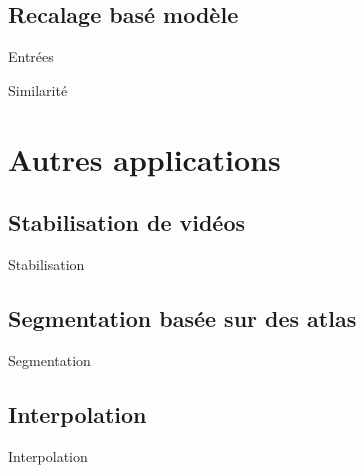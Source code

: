 \documentclass{beamer}
\begin{document}
\subsection{Recalage basé modèle}
\begin{frame}{Entrées}
 
\end{frame}
\begin{frame}{Similarité}
 
\end{frame}

\section{Autres applications}
\subsection{Stabilisation de vidéos}
\begin{frame}{Stabilisation}
 
\end{frame}

\subsection{Segmentation basée sur des atlas}
\begin{frame}{Segmentation}
 
\end{frame}
\subsection{Interpolation}
\begin{frame}{Interpolation}
 
\end{frame}
\end{document}
